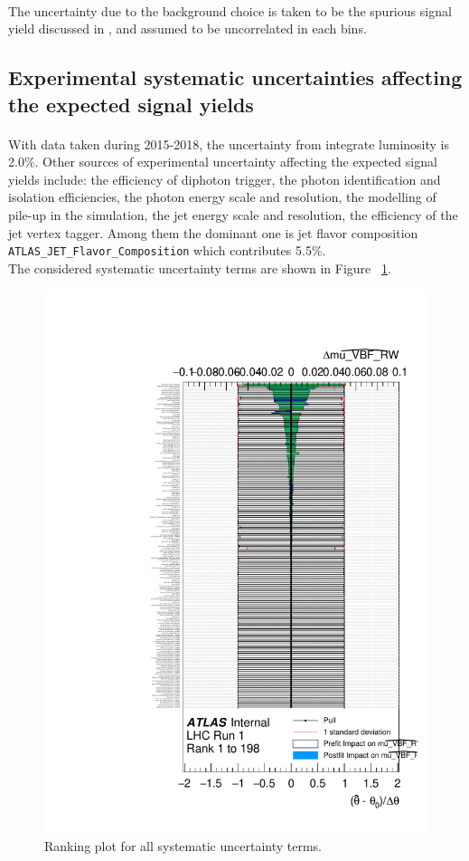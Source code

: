 \paragraph{} The uncertainty due to the background choice is taken to be the spurious signal yield discussed in \Sect{\ref{ssec:spurious_signal}}, and assumed to be uncorrelated in each bins. 


\subsection{Experimental systematic uncertainties affecting the expected signal yields}
\label{ssec:expuncert}

\paragraph{} With data taken during 2015-2018, the uncertainty from integrate luminosity is 2.0\%. Other sources of experimental uncertainty affecting the expected signal yields include: the efficiency of diphoton trigger, the photon identification and isolation efficiencies, the photon energy scale and resolution, the modelling of pile-up in the simulation, the jet energy scale and resolution, the efficiency of the jet vertex tagger. Among them the dominant one is jet flavor composition \texttt{ATLAS\_JET\_Flavor\_Composition} which contributes 5.5\%. \\

The considered systematic uncertainty terms are shown in Figure ~\ref{fig:syst_ranking}. 

\begin{figure}[h]
  \centering
  \includegraphics[width=.9\textwidth]{figure/ranking.pdf}
  \caption{Ranking plot for all systematic uncertainty terms. }
  \label{fig:syst_ranking}
\end{figure}


